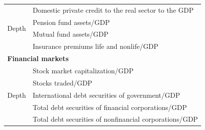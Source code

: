 \begin{refsection}
\begin{subappendices}
\begin{table}[ht!]
\begin{tabular}{ll}
      \midrule
      \multirow{4}{*}{Depth}	& Domestic private credit to the real sector to the GDP \\
                                  & Pension fund assets/GDP \\
                                  & Mutual fund assets/GDP \\
                                  & Insurance premiums life and nonlife/GDP \\
      \midrule
      \multicolumn{2}{l}{\textbf{Financial markets}} \\
      \midrule
      \multirow{6}{*}{Depth} 	& Stock market capitalization/GDP \\
                                  & Stocks traded/GDP \\
                                  & International debt securities of government/GDP \\
                                  & Total debt securities of financial corporations/GDP \\
                                  & Total debt securities of nonfinancial corporations/GDP \\
      \bottomrule
    \end{tabular}
\end{table}

\clearpage

\end{subappendices}
\end{refsection}

